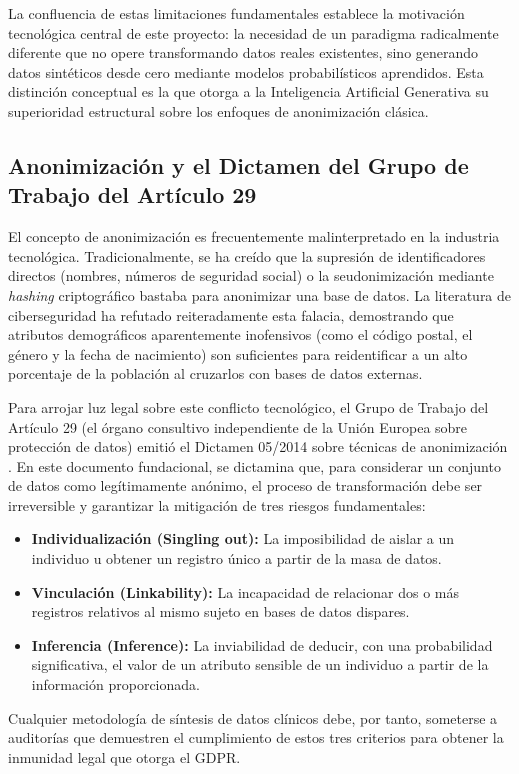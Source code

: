 La confluencia de estas limitaciones fundamentales establece la motivación tecnológica central de este proyecto: la necesidad de un paradigma radicalmente diferente que no opere transformando datos reales existentes, sino generando datos sintéticos desde cero mediante modelos probabilísticos aprendidos. Esta distinción conceptual es la que otorga a la Inteligencia Artificial Generativa su superioridad estructural sobre los enfoques de anonimización clásica.

\subsection{Anonimización y el Dictamen del Grupo de Trabajo del Artículo 29}

El concepto de anonimización es frecuentemente malinterpretado en la industria tecnológica. Tradicionalmente, se ha creído que la supresión de identificadores directos (nombres, números de seguridad social) o la seudonimización mediante \textit{hashing} criptográfico bastaba para anonimizar una base de datos. La literatura de ciberseguridad ha refutado reiteradamente esta falacia, demostrando que atributos demográficos aparentemente inofensivos (como el código postal, el género y la fecha de nacimiento) son suficientes para reidentificar a un alto porcentaje de la población al cruzarlos con bases de datos externas.

Para arrojar luz legal sobre este conflicto tecnológico, el Grupo de Trabajo del Artículo 29 (el órgano consultivo independiente de la Unión Europea sobre protección de datos) emitió el Dictamen 05/2014 sobre técnicas de anonimización \parencite{article29wp2014}. En este documento fundacional, se dictamina que, para considerar un conjunto de datos como legítimamente anónimo, el proceso de transformación debe ser irreversible y garantizar la mitigación de tres riesgos fundamentales:
\begin{itemize}
    \item \textbf{Individualización (Singling out):} La imposibilidad de aislar a un individuo u obtener un registro único a partir de la masa de datos.
    \item \textbf{Vinculación (Linkability):} La incapacidad de relacionar dos o más registros relativos al mismo sujeto en bases de datos dispares.
    \item \textbf{Inferencia (Inference):} La inviabilidad de deducir, con una probabilidad significativa, el valor de un atributo sensible de un individuo a partir de la información proporcionada.
\end{itemize}
Cualquier metodología de síntesis de datos clínicos debe, por tanto, someterse a auditorías que demuestren el cumplimiento de estos tres criterios para obtener la inmunidad legal que otorga el GDPR.

